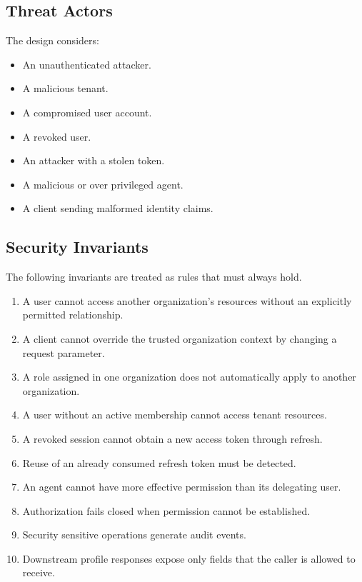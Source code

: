 \documentclass[11pt,a4paper]{article}
\begin{document}
\subsection{Threat Actors}

The design considers:

\begin{itemize}
    \item An unauthenticated attacker.
    \item A malicious tenant.
    \item A compromised user account.
    \item A revoked user.
    \item An attacker with a stolen token.
    \item A malicious or over privileged agent.
    \item A client sending malformed identity claims.
\end{itemize}

\subsection{Security Invariants}

The following invariants are treated as rules that must always hold.

\begin{enumerate}
    \item A user cannot access another organization's resources without an explicitly permitted relationship.
    \item A client cannot override the trusted organization context by changing a request parameter.
    \item A role assigned in one organization does not automatically apply to another organization.
    \item A user without an active membership cannot access tenant resources.
    \item A revoked session cannot obtain a new access token through refresh.
    \item Reuse of an already consumed refresh token must be detected.
    \item An agent cannot have more effective permission than its delegating user.
    \item Authorization fails closed when permission cannot be established.
    \item Security sensitive operations generate audit events.
    \item Downstream profile responses expose only fields that the caller is allowed to receive.
\end{enumerate}
\end{document}
